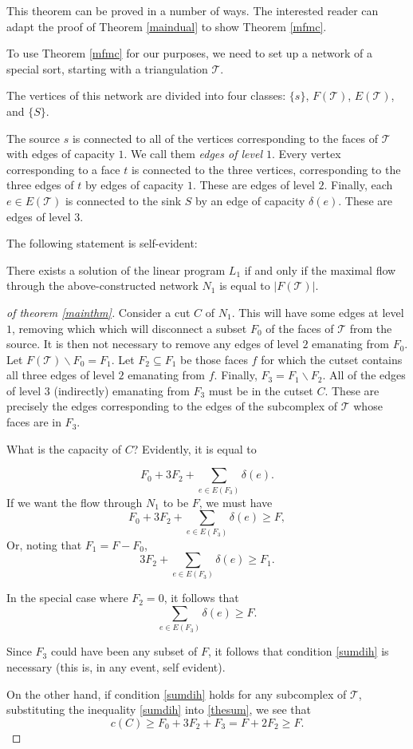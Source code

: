\documentclass{acmart}
\newcommand{\thm}[2]{\begin{#1} #2 \end{#1}}
\begin{document}
This theorem can be proved in a number of ways. The interested reader 
can adapt the proof of Theorem \ref{maindual} to show Theorem
\ref{mfmc}. 

To use Theorem \ref{mfmc} for our purposes, we need to set up a 
network of a special sort, starting with a triangulation $\mathcal{T}$.

The vertices of this network are divided into four classes: $\{s\}$, 
$F(\mathcal{T})$, $E(\mathcal{T})$, and $\{S\}$.

The source $s$ is connected to all of the vertices corresponding to 
the faces of $\mathcal{T}$ with edges of capacity $1$. We call them
\emph{edges of level $1$}. 
Every vertex 
corresponding to a face $t$ is connected to the three vertices, corresponding 
to the three edges of $t$ by edges of capacity $1$. These are edges of 
level $2$. Finally, each $e\in 
E(\mathcal{T})$ is connected to the sink $S$ by  an edge of capacity 
$\delta(e)$. These are edges of level $3.$

The following statement is self-evident:

\thm{observation}
{
There exists a solution of the linear program $L_{1}$ if and only if 
the maximal flow through the above-constructed network $N_{1}$ is 
equal to $|F(\mathcal{T})|$.
}

\begin{proof}[of theorem \ref{mainthm}]
Consider a cut $C$ of $N_{1}$. This will have some edges at level $1$, 
removing which which will disconnect a subset $F_{0}$ of the faces 
of $\mathcal{T}$ from the source. It is then not necessary to remove any 
edges of level $2$ emanating from $F_{0}$. Let $F(\mathcal{T}) 
\backslash F_{0} = F_{1}$. Let $F_{2} \subseteq F_{1}$ be those 
faces $f$ for which the cutset contains all three edges of level $2$ 
emanating from $f$. Finally, $F_{3} = F_{1} \backslash F_{2}$. All 
of the edges of level $3$ (indirectly) emanating from $F_{3}$ must be 
in the cutset $C$. These are precisely the edges corresponding to the 
edges of the subcomplex of $\mathcal{T}$ whose faces are in $F_{3}$.

What is the capacity of $C$? Evidently, it is equal to

$$
\label{thesum}
F_{0}+ 3 F_{2}+ \sum_{e\in E(F_{3})} \delta(e).
$$
If we want the flow through $N_{1}$ to be $F$, we must have
$$
F_{0}+ 3 F_{2}+ \sum_{e\in E(F_{3})} \delta(e) \geq F,
$$
Or, noting that $F_{1} = F - F_{0}$, 
$$
3 F_{2}+ \sum_{e\in E(F_{3})} \delta(e) \geq F_{1}.
$$

In the special case where $F_{2} = 0$, it follows that
\begin{equation}
\label{geq}
\sum_{e\in E(F_{3})} \delta(e) \geq F.
\end{equation}

Since $F_{3}$ could have been any subset of $F$, it follows that 
condition \ref{sumdih} is necessary (this is, in any event, self evident).

On the other hand, if condition \ref{sumdih} holds for any subcomplex 
of $\mathcal{T}$, substituting the inequality \ref{sumdih} into 
\ref{thesum}, we see that 
$$c(C)\geq F_{0}+ 3 F_{2}+ F_{3} = F + 2 F_{2} \geq F.$$
\end{proof}
\end{document}
